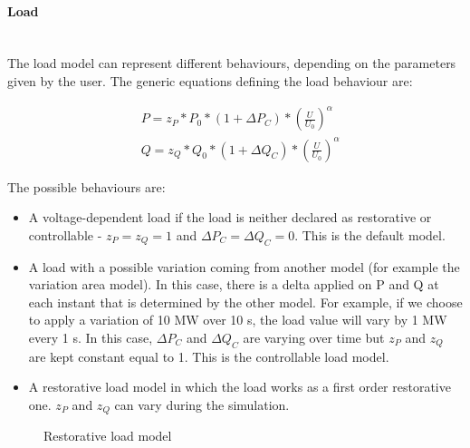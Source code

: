 \documentclass[a4paper, 12pt]{report}
\begin{document}
\paragraph{Load}
~~\\

The load model can represent different behaviours, depending on the parameters given by the user. The generic equations defining the load behaviour are:

\begin{equation}
\begin{aligned}
& P = z_{P} * P_{0} * (1 + \Delta P_{C}) * (\frac{U}{U_{0}})^\alpha \\
& Q = z_{Q} * Q_{0} * (1 + \Delta Q_{C}) * (\frac{U}{U_{0}})^\alpha
\end{aligned}
\label{Load model}
\end{equation}

The possible behaviours are:
\begin{itemize}
\item A voltage-dependent load if the load is neither declared as restorative or controllable - $z_{P} = z_{Q} = 1$ and $\Delta P_{C} = \Delta Q_{C} = 0 $. This is the default model.
\item A load with a possible variation coming from another model (for example the variation area model). In this case, there is a delta applied on P and Q at each instant that is determined by the other model. For example, if we choose to apply a variation of 10 MW over 10 s, the load value will vary by 1 MW every 1 s. In this case, $\Delta P_{C}$ and $\Delta Q_{C}$ are varying over time but $z_{P}$ and $z_{Q}$ are kept constant equal to 1. This is the controllable load model.
\item A restorative load model in which the load works as a first order restorative one. $z_{P}$ and $z_{Q}$ can vary during the simulation.
\end{itemize}

\begin{figure}[h]
  \setlength{\abovecaptionskip}{15pt}
\centering
\caption{Restorative load model}
\end{figure}
\end{document}
